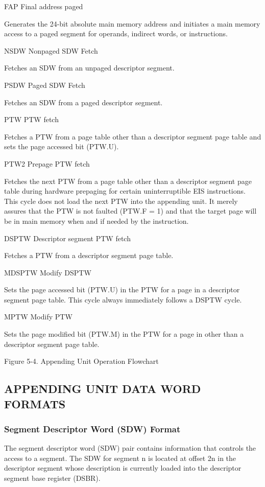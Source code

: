 FAP Final address paged

Generates the 24-bit absolute main memory address and initiates a main memory 
access to a paged segment for operands, indirect words, or instructions.

NSDW Nonpaged SDW Fetch

Fetches an SDW from an unpaged descriptor segment.

PSDW Paged SDW Fetch

Fetches an SDW from a paged descriptor segment.

PTW PTW fetch

Fetches a PTW from a page table other than a descriptor segment page table and 
sets the page accessed bit (PTW.U).

PTW2 Prepage PTW fetch

Fetches the next PTW from a page table other than a descriptor segment page
table during hardware prepaging for certain uninterruptible EIS instructions.
This cycle does not load the next PTW into the appending unit. It merely
assures that the PTW is not faulted (PTW.F = 1) and that the target page will
be in main memory when and if needed by the instruction.

DSPTW Descriptor segment PTW fetch

Fetches a PTW from a descriptor segment page table.

MDSPTW Modify DSPTW

Sets the page accessed bit (PTW.U) in the PTW for a page in a descriptor
segment page table. This cycle always immediately follows a DSPTW cycle.

MPTW Modify PTW

Sets the page modified bit (PTW.M) in the PTW for a page in other than a
descriptor segment page table.

Figure 5-4. Appending Unit Operation Flowchart

\subsection{APPENDING UNIT DATA WORD FORMATS}

\subsubsection{Segment Descriptor Word (SDW) Format}

The segment descriptor word (SDW) pair contains information that controls the
access to a segment. The SDW for segment n is located at offset 2n in the
descriptor segment whose description is currently loaded into the descriptor
segment base register (DSBR).

